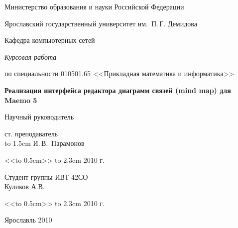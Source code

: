 \thispagestyle{empty}

\enlargethispage{2cm}
{
\begin{center}
\renewcommand{\baselinestretch}{1.25}
{
\selectfont
Министерство образования и науки Российской Федерации

Ярославский государственный университет им.~П.\,Г. Демидова

Кафедра компьютерных сетей

\vspace{6cm}

{\em Курсовая работа}

по специальности 010501.65 <<Прикладная математика и информатика>>

\vspace{0.5cm}

{ \Large \bf Реализация интерфейса редактора диаграмм связей (mind map) для Maemo 5}

\vspace{3cm}

\hfill\parbox{7cm}
{ 
Научный руководитель

ст. преподаватель\\
\hbox to 1.5cm{\hrulefill} И.\,В.~Парамонов

<<\hbox to 0.5cm{\hrulefill}>> \hbox to 2.3cm{\hrulefill} 2010 г.
}

\vspace{1.5cm}

\hfill\parbox{7cm}
{ 
Студент группы ИВТ-42СО\\
Куликов А.В.

<<\hbox to 0.5cm{\hrulefill}>> \hbox to 2.3cm{\hrulefill} 2010 г.
}

\vspace{5cm}

Ярославль 2010
}
\end{center}
}

\newpage
